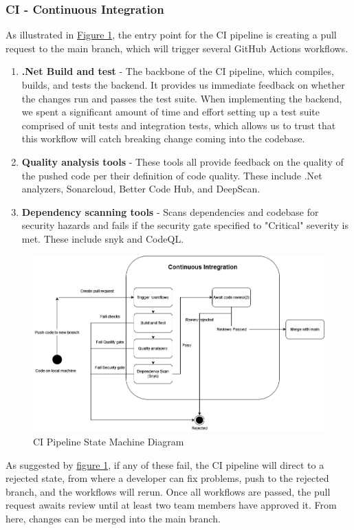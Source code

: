 \subsubsection{CI - Continuous Integration}
\label{subsubsec:ci}
As illustrated in \hyperref[fig:CIStateMachine]{Figure 1}, the entry point for the CI pipeline is creating a pull request to the main branch, which will trigger several GitHub Actions workflows.
\begin{enumerate}
    \item \textbf{.Net Build and test} - The backbone of the CI pipeline, which compiles, builds, and tests the backend. It provides us immediate feedback on whether the changes run and passes the test suite. When implementing the backend, we spent a significant amount of time and effort setting up a test suite comprised of unit tests and integration tests, which allows us to trust that this workflow will catch breaking change coming into the codebase.
    \item \textbf{Quality analysis tools} - These tools all provide feedback on the quality of the pushed code per their definition of code quality. These include .Net analyzers, Sonarcloud, Better Code Hub, and DeepScan.
    \item \textbf{Dependency scanning tools} - Scans dependencies and codebase for security hazards and fails if the security gate specified to "Critical" severity is met. These include snyk and CodeQL.
\end{enumerate}


\begin {figure}[H]
    \centering
    \includegraphics[scale=0.50]{images/DevopsDiagrams-StateMachine CI.drawio(4).png}
    \caption{CI Pipeline State Machine Diagram}
    \label{fig:CIStateMachine}
\end{figure}
As suggested by \hyperref[fig:CIStateMachine]{figure 1}, if any of these fail, the CI pipeline will direct to a rejected state, from where a developer can fix problems, push to the rejected branch, and the workflows will rerun. Once all workflows are passed, the pull request awaits review until at least two team members have approved it. From here, changes can be merged into the main branch.

